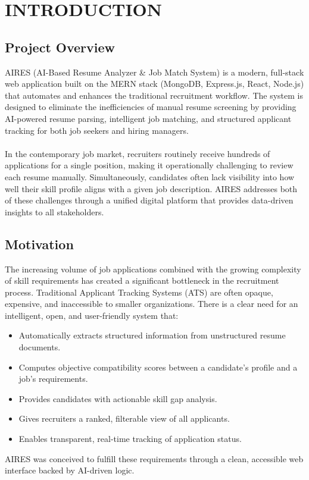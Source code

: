 \chapter{INTRODUCTION}

\section{Project Overview}
AIRES (AI-Based Resume Analyzer \& Job Match System) is a modern, full-stack web application built on the MERN stack (MongoDB, Express.js, React, Node.js) that automates and enhances the traditional recruitment workflow. The system is designed to eliminate the inefficiencies of manual resume screening by providing AI-powered resume parsing, intelligent job matching, and structured applicant tracking for both job seekers and hiring managers.\\\\
In the contemporary job market, recruiters routinely receive hundreds of applications for a single position, making it operationally challenging to review each resume manually. Simultaneously, candidates often lack visibility into how well their skill profile aligns with a given job description. AIRES addresses both of these challenges through a unified digital platform that provides data-driven insights to all stakeholders.

\section{Motivation}
The increasing volume of job applications combined with the growing complexity of skill requirements has created a significant bottleneck in the recruitment process. Traditional Applicant Tracking Systems (ATS) are often opaque, expensive, and inaccessible to smaller organizations. There is a clear need for an intelligent, open, and user-friendly system that:
\begin{itemize}
    \item Automatically extracts structured information from unstructured resume documents.
    \item Computes objective compatibility scores between a candidate's profile and a job's requirements.
    \item Provides candidates with actionable skill gap analysis.
    \item Gives recruiters a ranked, filterable view of all applicants.
    \item Enables transparent, real-time tracking of application status.
\end{itemize}
AIRES was conceived to fulfill these requirements through a clean, accessible web interface backed by AI-driven logic.

